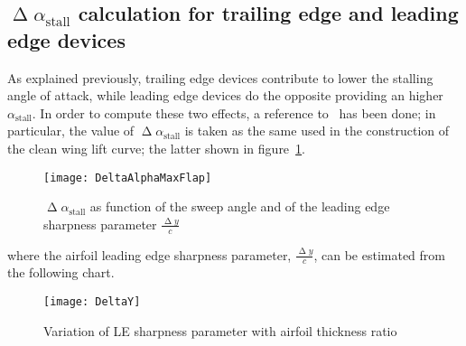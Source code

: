 \subsection{$\upDelta\alpha_{\text{stall}}$ calculation for trailing edge and leading edge devices}
As explained previously, trailing edge devices contribute to lower the stalling angle of attack, while leading edge devices do the opposite providing an higher $\alpha_{\text{stall}}$. 
%
In order to compute these two effects, a reference to~\cite{nicolai2010fundamentals} has been done; in particular, the value of $\upDelta\alpha_{\text{stall}}$ is taken as the same used in the construction of the clean wing lift curve; the latter shown in figure~\ref{fig:DeltaAlphaMaxFlap}.
%
\begin{figure}[H]
\centering
\texttt{[image: DeltaAlphaMaxFlap]}
\caption{$\upDelta\alpha_{\text{stall}}$ as function of the sweep angle and of the leading edge sharpness parameter $\frac{\upDelta y}{c}$}
\label{fig:DeltaAlphaMaxFlap}
\end{figure}
%
\noindent
where the airfoil leading edge sharpness parameter, $\frac{\upDelta y}{c}$, can be estimated from the following chart.
%
\begin{figure}[H]
\centering
\texttt{[image: DeltaY]}
\caption{Variation of LE sharpness parameter with airfoil thickness ratio}
\label{fig:DeltaY}
\end{figure}
%
